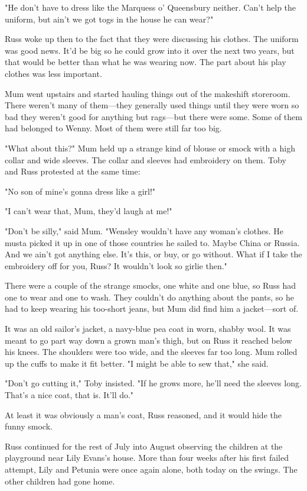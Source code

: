 "He don't have to dress like the Marquess o' Queensbury neither. Can't help the uniform, but ain't we got togs in the house he can wear?"

Russ woke up then to the fact that they were discussing his clothes. The uniform was good news. It'd be big so he could grow into it over the next two years, but that would be better than what he was wearing now. The part about his play clothes was less important.

Mum went upstairs and started hauling things out of the makeshift storeroom. There weren't many of them—they generally used things until they were worn so bad they weren't good for anything but rags—but there were some. Some of them had belonged to Wenny. Most of them were still far too big.

"What about this?" Mum held up a strange kind of blouse or smock with a high collar and wide sleeves. The collar and sleeves had embroidery on them. Toby and Russ protested at the same time:

"No son of mine's gonna dress like a girl!"

"I can't wear that, Mum, they'd laugh at me!"

"Don't be silly," said Mum. "Wensley wouldn't have any woman's clothes. He musta picked it up in one of those countries he sailed to. Maybe China or Russia. And we ain't got anything else. It's this, or buy, or go without. What if I take the embroidery off for you, Russ? It wouldn't look so girlie then."

There were a couple of the strange smocks, one white and one blue, so Russ had one to wear and one to wash. They couldn't do anything about the pants, so he had to keep wearing his too-short jeans, but Mum did find him a jacket—sort of.

It was an old sailor's jacket, a navy-blue pea coat in worn, shabby wool. It was meant to go part way down a grown man's thigh, but on Russ it reached below his knees. The shoulders were too wide, and the sleeves far too long. Mum rolled up the cuffs to make it fit better. "I might be able to sew that," she said.

"Don't go cutting it," Toby insisted. "If he grows more, he'll need the sleeves long. That's a nice coat, that is. It'll do."

At least it was obviously a man's coat, Russ reasoned, and it would hide the funny smock.

Russ continued for the rest of July into August observing the children at the playground near Lily Evans's house. More than four weeks after his first failed attempt, Lily and Petunia were once again alone, both today on the swings. The other children had gone home.

